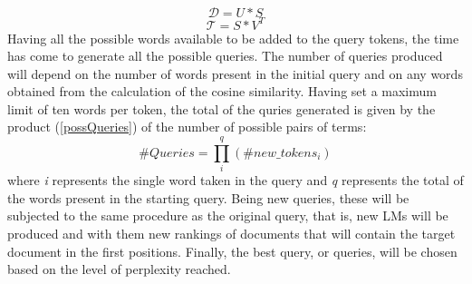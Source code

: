\begin{equation}\label{matrixD}
    \mathcal{D} = U*S
\end{equation}
\begin{equation}\label{matrixT}
    \mathcal{T} = S*V^T
\end{equation}
Having all the possible words available to be added to the query tokens, the 
time has come to generate all the possible queries. The number of queries 
produced will depend on the number of words present in the initial query and 
on any words obtained from the calculation of the cosine similarity. Having 
set a maximum limit of ten words per token, the total of the quries generated 
is given by the product (\ref{possQueries}) of the number of possible pairs of terms: 
\begin{equation}\label{possQueries}
    \#Queries = \prod_i^q (\#new\_tokens_i)
\end{equation}
where \emph{i} represents the single word taken in the query and \emph{q} represents the 
total of the words present in the starting query. Being new queries, these 
will be subjected to the same procedure as the original query, that is, new 
LMs will be produced and with them new rankings of documents that will 
contain the target document in the first positions. Finally, the best query, 
or queries, will be chosen based on the level of perplexity reached.